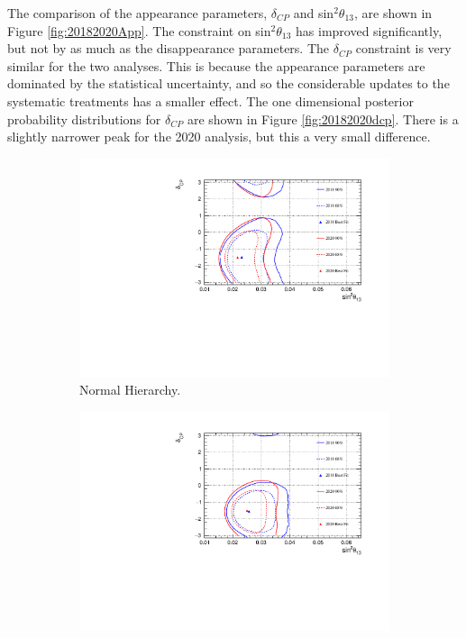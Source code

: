 The comparison of the appearance parameters, $\delta_{CP}$ and sin$^{2}\theta_{13}$, are shown in Figure \ref{fig:20182020App}. The constraint on sin$^{2}\theta_{13}$ has improved significantly, but not by as much as the disappearance parameters. The $\delta_{CP}$ constraint is very similar for the two analyses. This is because the appearance parameters are dominated by the statistical uncertainty, and so the considerable updates to the systematic treatments has a smaller effect. The one dimensional posterior probability distributions for $\delta_{CP}$ are shown in Figure \ref{fig:20182020dcp}. There is a slightly narrower peak for the 2020 analysis, but this a very small difference.

\begin{figure}
\centering
\begin{subfigure}{.7\textwidth}
  \centering
  \includegraphics[width=0.95\linewidth]{figs/comparedmach3contours_2018vs2020Kevin/comparedmach3contours_RCeff_app_asimovA_NH}
  \caption{Normal Hierarchy.}
  \label{fig:20182020AppNH}
\end{subfigure}
\begin{subfigure}{.7\textwidth}
  \centering
  \includegraphics[width=0.95\linewidth]{figs/comparedmach3contours_2018vs2020Kevin/comparedmach3contours_RCeff_app_asimovA_IH}

\end{subfigure}
\end{figure}
